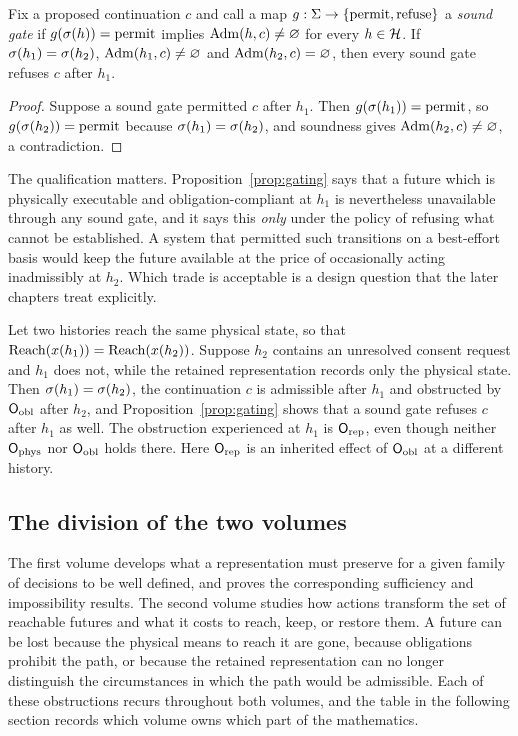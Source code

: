\begin{newresult}\label{prop:gating}
Fix a proposed continuation $c$ and call a map $g:\Sigma\to\{\text{permit},\text{refuse}\}$ a \emph{sound gate} if $g(\sigma(h))=\text{permit}$ implies $\operatorname{Adm}(h,c)\neq\varnothing$ for every $h\in\mathcal{H}$. If $\sigma(h_1)=\sigma(h_2)$, $\operatorname{Adm}(h_1,c)\neq\varnothing$ and $\operatorname{Adm}(h_2,c)=\varnothing$, then every sound gate refuses $c$ after $h_1$.
\end{newresult}
\begin{proof}
Suppose a sound gate permitted $c$ after $h_1$. Then $g(\sigma(h_1))=\text{permit}$, so $g(\sigma(h_2))=\text{permit}$ because $\sigma(h_1)=\sigma(h_2)$, and soundness gives $\operatorname{Adm}(h_2,c)\neq\varnothing$, a contradiction.
\end{proof}

The qualification matters. Proposition~\ref{prop:gating} says that a future which is physically executable and obligation-compliant at $h_1$ is nevertheless unavailable through any sound gate, and it says this \emph{only} under the policy of refusing what cannot be established. A system that permitted such transitions on a best-effort basis would keep the future available at the price of occasionally acting inadmissibly at $h_2$. Which trade is acceptable is a design question that the later chapters treat explicitly.

\begin{example}\label{ex:masking}
Let two histories reach the same physical state, so that $\operatorname{Reach}(x(h_1))=\operatorname{Reach}(x(h_2))$. Suppose $h_2$ contains an unresolved consent request and $h_1$ does not, while the retained representation records only the physical state. Then $\sigma(h_1)=\sigma(h_2)$, the continuation $c$ is admissible after $h_1$ and obstructed by $\mathsf{O}_{\mathrm{obl}}$ after $h_2$, and Proposition~\ref{prop:gating} shows that a sound gate refuses $c$ after $h_1$ as well. The obstruction experienced at $h_1$ is $\mathsf{O}_{\mathrm{rep}}$, even though neither $\mathsf{O}_{\mathrm{phys}}$ nor $\mathsf{O}_{\mathrm{obl}}$ holds there. Here $\mathsf{O}_{\mathrm{rep}}$ is an inherited effect of $\mathsf{O}_{\mathrm{obl}}$ at a different history.
\end{example}

\subsection*{The division of the two volumes}

The first volume develops what a representation must preserve for a given family of decisions to be well defined, and proves the corresponding sufficiency and impossibility results. The second volume studies how actions transform the set of reachable futures and what it costs to reach, keep, or restore them. A future can be lost because the physical means to reach it are gone, because obligations prohibit the path, or because the retained representation can no longer distinguish the circumstances in which the path would be admissible. Each of these obstructions recurs throughout both volumes, and the table in the following section records which volume owns which part of the mathematics.
